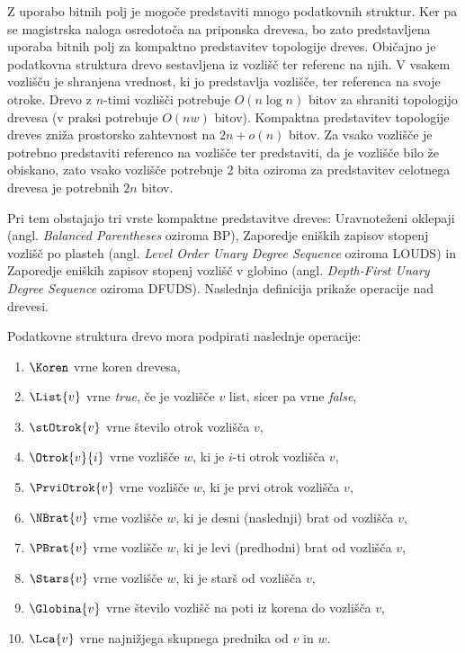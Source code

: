 Z uporabo bitnih polj je mogoče predstaviti mnogo podatkovnih struktur. Ker pa se magistrska naloga osredotoča na priponska drevesa, bo zato predstavljena uporaba bitnih polj za kompaktno predstavitev topologije dreves. Običajno je podatkovna struktura drevo sestavljena iz vozlišč ter referenc na njih. V vsakem vozlišču je shranjena vrednost, ki jo predstavlja vozlišče, ter referenca na svoje otroke. Drevo z $n$-timi vozlišči potrebuje $O(n\log{n})$ bitov za shraniti topologijo drevesa (v praksi potrebuje $O(nw)$ bitov). Kompaktna predstavitev topologije dreves zniža prostorsko zahtevnost na $2n+o(n)$ bitov. Za vsako vozlišče je potrebno predstaviti referenco na vozlišče ter predstaviti, da je vozlišče bilo že obiskano, zato vsako vozlišče potrebuje 2 bita oziroma za predstavitev celotnega drevesa je potrebnih $2n$ bitov.

Pri tem obstajajo tri vrste kompaktne predstavitve dreves: Uravnoteženi oklepaji (angl. \textit{Balanced Parentheses} oziroma BP), Zaporedje eniških zapisov stopenj vozlišč po plasteh (angl. \textit{Level Order Unary Degree Sequence} oziroma LOUDS) in Zaporedje eniških zapisov stopenj vozlišč v globino (angl. \textit{Depth-First Unary Degree Sequence} oziroma DFUDS). Naslednja definicija prikaže operacije nad drevesi.


\begin{defi}\label{def:drevo}
    Podatkovne struktura drevo mora podpirati naslednje operacije:
    \begin{enumerate}
        \item $\Koren$ vrne koren drevesa,
        \item $\List{v}$ vrne \textit{true}, če je vozlišče $v$ list, sicer pa vrne \textit{false},
        \item $\stOtrok{v}$ vrne število otrok vozlišča $v$,
        \item $\Otrok{v}{i}$ vrne vozlišče $w$, ki je $i$-ti otrok vozlišča $v$,
        \item $\PrviOtrok{v}$ vrne vozlišče $w$, ki je prvi otrok vozlišča $v$,
        \item $\NBrat{v}$ vrne vozlišče $w$, ki je desni (naslednji) brat od vozlišča $v$,
        \item $\PBrat{v}$ vrne vozlišče $w$, ki je levi (predhodni) brat od vozlišča $v$,
        \item $\Stars{v}$ vrne vozlišče $w$, ki je starš od vozlišča $v$,
        \item $\Globina{v}$ vrne število vozlišč na poti iz korena do vozlišča $v$, %
        \item $\Lca{v}$ vrne najnižjega skupnega prednika od $v$ in $w$.
    \end{enumerate}
\end{defi}


